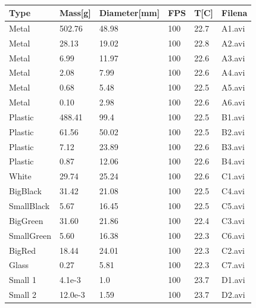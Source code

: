 \documentclass[11pt,a4paper]{article}
\begin{document}
  \begin{table}[H]
    \center
    \begin{tabular}{| l | l | l | l | l | l |}
      \hline
      Type       & Mass[g] & Diameter[mm]   & FPS    & T[C]   & Filena  \\ \hline
      Metal      & 502.76  & 48.98          & 100    & 22.7   & A1.avi  \\ \hline
      Metal      & 28.13   & 19.02          & 100    & 22.8   & A2.avi  \\ \hline 
      Metal      & 6.99    & 11.97          & 100    & 22.6   & A3.avi  \\ \hline
      Metal      & 2.08    & 7.99           & 100    & 22.6   & A4.avi  \\ \hline
      Metal      & 0.68    & 5.48           & 100    & 22.5   & A5.avi  \\ \hline
      Metal      & 0.10    & 2.98           & 100    & 22.6   & A6.avi  \\ \hline
      Plastic    & 488.41  & 99.4           & 100    & 22.5   & B1.avi  \\ \hline
      Plastic    & 61.56   & 50.02          & 100    & 22.5   & B2.avi  \\ \hline
      Plastic    & 7.12    & 23.89          & 100    & 22.6   & B3.avi  \\ \hline
      Plastic    & 0.87    & 12.06          & 100    & 22.6   & B4.avi  \\ \hline
      White      & 29.74   & 25.24          & 100    & 22.6   & C1.avi  \\ \hline
      BigBlack   & 31.42   & 21.08          & 100    & 22.5   & C4.avi  \\ \hline
      SmallBlack & 5.67    & 16.45          & 100    & 22.5   & C5.avi  \\ \hline
      BigGreen   & 31.60   & 21.86          & 100    & 22.4   & C3.avi  \\ \hline
      SmallGreen & 5.60    & 16.38          & 100    & 22.3   & C6.avi  \\ \hline
      BigRed     & 18.44   & 24.01          & 100    & 22.3   & C2.avi  \\ \hline
      Glass      & 0.27    & 5.81           & 100    & 22.3   & C7.avi  \\ \hline
      Small 1    & 4.1e-3  & 1.0            & 100    & 23.7   & D1.avi  \\ \hline
      Small 2    & 12.0e-3 & 1.59           & 100    & 23.7   & D2.avi  \\ \hline   
    \end{tabular}
    \caption{}
  \end{table}
  
\end{document}
